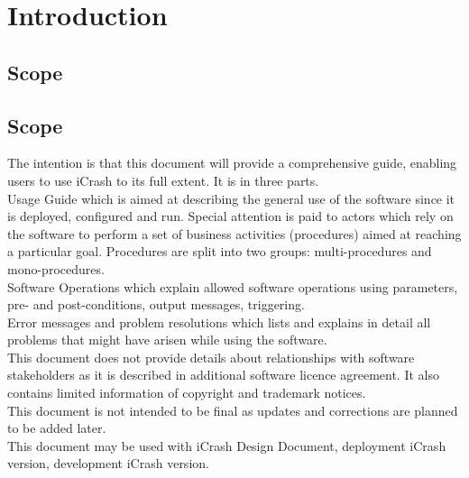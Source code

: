 \chapter{Introduction}
\label{chap:introduction}


\section{Scope}
\section{Scope}
The intention is that this document will provide a comprehensive guide, enabling
users to use iCrash to its full extent. It is in three parts.\\
 
Usage Guide which is aimed at describing the general use of the software since
it is deployed, configured and run. Special attention is paid to actors which
rely on the software to perform a set of business activities (procedures) aimed at reaching a particular goal. Procedures are split into two groups: multi-procedures and mono-procedures.\\

Software Operations which explain allowed software operations using parameters,
pre- and post-conditions, output messages, triggering.\\ 

Error messages and problem resolutions which lists and explains in detail all
problems that might have arisen while using the software. \\

This document does not provide details about relationships with software
stakeholders as it is described in additional software licence agreement. It
also contains limited information of copyright and trademark notices.\\

This document is not intended to be final as updates and corrections are planned
to be added later. \\

This document may be used with iCrash Design Document, deployment iCrash
version, development iCrash version.\\




 
